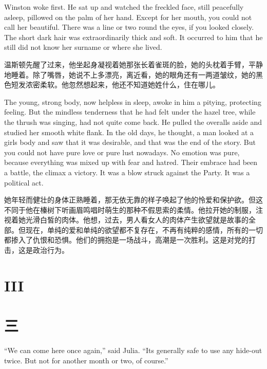 \begin{paracol}{2}
Winston woke first. He sat up and watched the freckled face, still
peacefully asleep, pillowed on the palm of her hand. Except for her
mouth, you could not call her beautiful. There was a line or two round
the eyes, if you looked closely. The short dark hair was extraordinarily
thick and soft. It occurred to him that he still did not know her
surname or where she lived.

\switchcolumn

温斯顿先醒了过来，他坐起身凝视着她那张长着雀斑的脸，她的头枕着手臂，平静地睡着。除了嘴唇，她说不上多漂亮，离近看，她的眼角还有一两道皱纹，她的黑色短发浓密柔软。他忽然想起来，他还不知道她姓什么，住在哪儿。

\switchcolumn*

The young, strong body, now helpless in sleep, awoke in him a pitying,
protecting feeling. But the mindless tenderness that he had felt under
the hazel tree, while the thrush was singing, had not quite come back.
He pulled the overalls aside and studied her smooth white flank. In the
old days, he thought, a man looked at a girl\textquotesingle s body and
saw that it was desirable, and that was the end of the story. But you
could not have pure love or pure lust nowadays. No emotion was pure,
because everything was mixed up with fear and hatred. Their embrace had
been a battle, the climax a victory. It was a blow struck against the
Party. It was a political act.

\switchcolumn

她年轻而健壮的身体正熟睡着，那无依无靠的样子唤起了他的怜爱和保护欲。但这不同于他在榛树下听画眉鸣唱时萌生的那种不假思索的柔情。他拉开她的制服，注视着她光滑白皙的肉体。他想，过去，男人看女人的肉体产生欲望就是故事的全部。但现在，单纯的爱和单纯的欲望都不复存在，不再有纯粹的感情，所有的一切都掺入了仇恨和恐惧。他们的拥抱是一场战斗，高潮是一次胜利。这是对党的打击，这是政治行为。

\switchcolumn*


\section{III}\label{iii-1}

\switchcolumn

\section*{三}\label{ux5341ux4e00}

\switchcolumn*

``We can come here once again,'' said Julia. ``It\textquotesingle s
generally safe to use any hide-out twice. But not for another month or
two, of course.''


\end{paracol}
